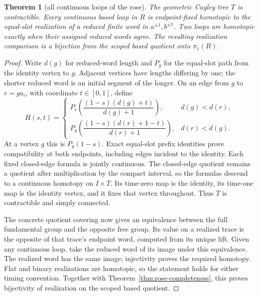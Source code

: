 \documentclass[10pt,reqno]{amsart}
\theoremstyle{definition}
\theoremstyle{plain}
\newtheorem{theorem}[definition]{Theorem}
\theoremstyle{remark}
\begin{document}
\enlargethispage{40pt}
\begin{samepage}
\begin{theorem}[all continuous loops of the rose]
\label{thm:rose-all-loops}
The geometric Cayley tree $T$ is contractible. Every continuous based loop
in $R$ is endpoint-fixed homotopic to the equal-slot realization of a
reduced finite word in $a^{\pm1},b^{\pm1}$. Two loops are homotopic exactly
when their assigned reduced words agree. The resulting realization
comparison is a bijection from the scoped based quotient onto $\pi_1(R)$.
\end{theorem}
\end{samepage}
\begin{proof}
Write $d(g)$ for reduced-word length and $P_g$ for the equal-slot path from
the identity vertex to $g$. Adjacent vertices have lengths differing by one;
the shorter reduced word is an initial segment of the longer. On an edge
from $g$ to $r=ga_i$, with coordinate $t\in[0,1]$, define
\[
 H(s,t)=
 \begin{cases}
 P_r\!\left(\dfrac{(1-s)(d(g)+t)}{d(g)+1}\right),&d(g)<d(r),\\[2mm]
 P_g\!\left(\dfrac{(1-s)(d(r)+1-t)}{d(r)+1}\right),&d(r)<d(g).
 \end{cases}
\]
At a vertex $g$ this is $P_g(1-s)$. Exact equal-slot prefix identities
prove compatibility at both endpoints, including edges incident to the
identity. Each fixed closed-edge formula is jointly continuous. The
closed-edge quotient remains a quotient after multiplication by the compact
interval, so the formulas descend to a continuous homotopy on $I\times T$.
Its time-zero map is the identity, its time-one map is the identity vertex,
and it fixes that vertex throughout. Thus $T$ is contractible and simply
connected.

The concrete quotient covering now gives an equivalence between the full
fundamental group and the opposite free group. Its value on a realized
trace is the opposite of that trace's endpoint word, computed from its
unique lift. Given any continuous loop, take the reduced word of its image
under this equivalence. The realized word has the same image; injectivity
proves the required homotopy. Flat and binary realizations are homotopic,
so the statement holds for either timing convention. Together with
Theorem~\ref{thm:rose-completeness}, this proves bijectivity of realization
on the scoped based quotient.
\end{proof}
\end{document}
